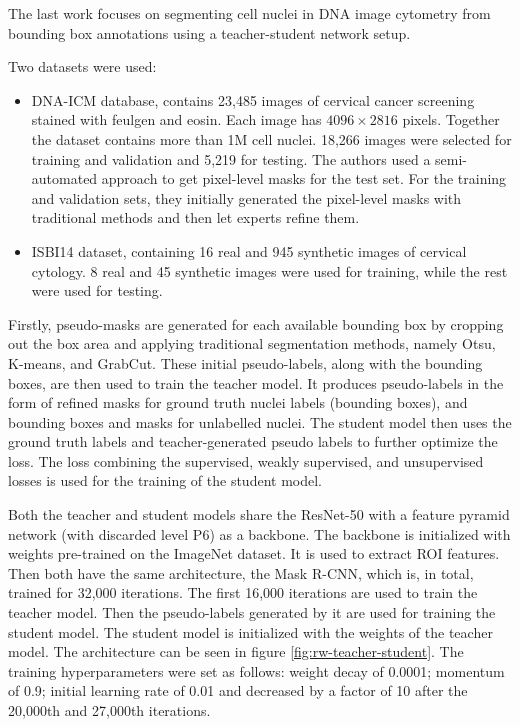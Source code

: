 The last work focuses on segmenting cell nuclei in DNA image cytometry from bounding box annotations using a teacher-student network setup.

Two datasets were used:

\begin{itemize}
    \item DNA-ICM database, contains 23,485 images of cervical cancer screening stained with feulgen and eosin. Each image has $4096\!\times\!2816$ pixels. Together the dataset contains more than 1M cell nuclei. 18,266 images were selected for training and validation and 5,219 for testing. The authors used a semi-automated approach to get pixel-level masks for the test set. For the training and validation sets, they initially generated the pixel-level masks with traditional methods and then let experts refine them.
    \item ISBI14 dataset, containing 16 real and 945 synthetic images of cervical cytology. 8 real and 45 synthetic images were used for training, while the rest were used for testing.
\end{itemize}

Firstly, pseudo-masks are generated for each available bounding box by cropping out the box area and applying traditional segmentation methods, namely Otsu, K-means, and GrabCut. These initial pseudo-labels, along with the bounding boxes, are then used to train the teacher model. It produces pseudo-labels in the form of refined masks for ground truth nuclei labels (bounding boxes), and bounding boxes and masks for unlabelled nuclei. The student model then uses the ground truth labels and teacher-generated pseudo labels to further optimize the loss. The loss combining the supervised, weakly supervised, and unsupervised losses is used for the training of the student model.

Both the teacher and student models share the ResNet-50 with a feature pyramid network (with discarded level P6) as a backbone. The backbone is initialized with weights pre-trained on the ImageNet dataset. It is used to extract ROI features. Then both have the same architecture, the Mask R-CNN, which is, in total, trained for 32,000 iterations. The first 16,000 iterations are used to train the teacher model. Then the pseudo-labels generated by it are used for training the student model. The student model is initialized with the weights of the teacher model. The architecture can be seen in figure \ref{fig:rw-teacher-student}. The training hyperparameters were set as follows: weight decay of 0.0001; momentum of 0.9; initial learning rate of 0.01 and decreased by a factor of 10 after the 20,000th and 27,000th iterations.

